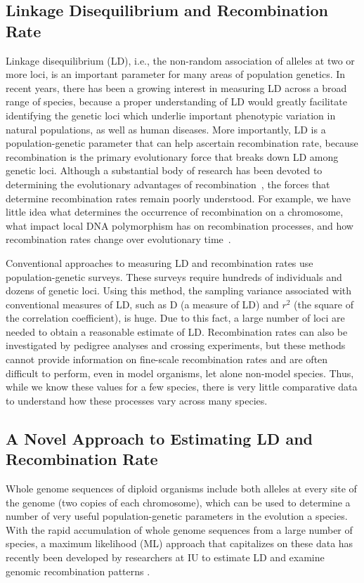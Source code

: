 \documentclass{sig-alternate}
\begin{document}
\subsection{Linkage Disequilibrium and Recombination Rate}\label{sec:LD}
Linkage disequilibrium (LD), i.e., the non-random association of alleles at two or more loci, is an important
parameter for many areas of population genetics.  In recent years, there has been a growing interest in
measuring LD across a broad range of species, because a proper understanding of LD would greatly facilitate
identifying the genetic loci which underlie important phenotypic variation in natural populations, as well as
human diseases. More importantly, LD is a population-genetic parameter that can help ascertain recombination
rate, because recombination is the primary evolutionary force that breaks down LD among genetic loci. Although
a substantial body of research has been devoted to determining the evolutionary advantages of
recombination~\cite{resolving-paradox}, the forces that determine recombination rates remain poorly
understood. For example, we have little idea what determines the occurrence of recombination on a chromosome,
what impact local DNA polymorphism has on recombination processes, and how recombination rates change over
evolutionary time~\cite{stumpf}.

Conventional approaches to measuring LD and recombination rates use population-genetic surveys. These surveys
require hundreds of individuals and dozens of genetic loci. Using this method, the sampling variance
associated with conventional measures of LD, such as D (a measure of LD) and $r^2$ (the square of the
correlation coefficient), is huge. Due to this fact, a large number of loci are needed to obtain a reasonable
estimate of LD.  Recombination rates can also be investigated by pedigree analyses and crossing experiments,
but these methods cannot provide information on fine-scale recombination rates and are often difficult to
perform, even in model organisms, let alone non-model species. Thus, while we know these values for a few
species, there is very little comparative data to understand how these processes vary across many species.

\subsection{ A Novel Approach to Estimating LD and Recombination Rate}\label{sec:migration}
Whole genome sequences of diploid organisms include both alleles at every site of the genome (two copies of
each chromosome), which can be used to determine a number of very useful population-genetic parameters in the
evolution a species. With the rapid accumulation of whole genome sequences from a large number of species, a
maximum likelihood (ML) approach that capitalizes on these data has recently been developed by researchers at
IU to estimate LD and examine genomic recombination patterns \cite{Lynch01112008,MEC:MEC4482}.
\end{document}

